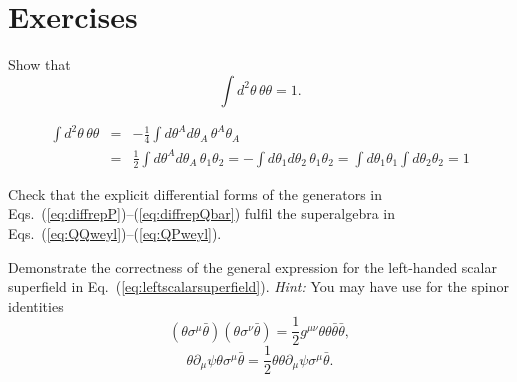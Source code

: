 \documentclass[notes.tex]{subfiles}
\begin{document}
\section{Exercises}
\noindent

\begin{Exercise}
Show that
\[\int d^2\theta\,\theta\theta = 1.\]
\end{Exercise}

\begin{Answer}
\begin{eqnarray*}
\int d^2\theta\,\theta\theta &=& - \frac{1}{4} \int d\theta^Ad\theta_A\,\theta^A\theta_A \\
&=& \frac{1}{2} \int d\theta^Ad\theta_A\,\theta_1\theta_2
= - \int d\theta_1d\theta_2\,\theta_1\theta_2=\int d\theta_1\theta_1\int d\theta_2\theta_2=1
\end{eqnarray*}
\end{Answer}

\begin{Exercise}
Check that the explicit differential forms of the generators in Eqs.~(\ref{eq:diffrepP})--(\ref{eq:diffrepQbar}) fulfil the superalgebra in Eqs.~(\ref{eq:QQweyl})--(\ref{eq:QPweyl}).
\end{Exercise}

\begin{Exercise}
Demonstrate the correctness of the general expression for the left-handed scalar superfield in Eq.~(\ref{eq:leftscalarsuperfield}). {\it Hint:} You may have use for the spinor identities
\[ (\theta\sigma^\mu \bar{\theta})(\theta\sigma^\nu \bar{\theta})=\frac{1}{2}g^{\mu\nu}\theta\theta\bar\theta\bar\theta, \]
\[ \theta\partial_\mu\psi\theta\sigma^\mu \bar{\theta}=\frac{1}{2}\theta\theta\partial_\mu \psi\sigma^\mu\bar{\theta}. \]
\end{Exercise}
\end{document}
